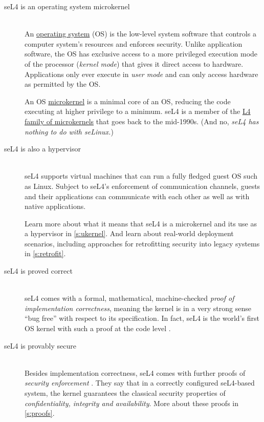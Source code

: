 \documentclass[english,a4paper,12pt\ifDraft,draft\fi]{report}
\newcommand{\Break}{\ \nopagebreak\\}
\providecommand{\href}[2]{\url{#2}}
\begin{document}
  \begin{description}
  \item[seL4 is an operating system microkernel]\Break
    An \href{https://en.wikipedia.org/wiki/Operating_system}{operating
      system} (OS) is the low-level system software that controls a
    computer system's resources and enforces security. Unlike
    application software, the OS has
    exclusive access to a more privileged execution mode of the processor (\emph{kernel mode})
    that gives it direct access to hardware. Applications only ever
    execute in
    \emph{user mode} and can only access hardware as permitted by the
    OS.

    An OS
    \href{https://en.wikipedia.org/wiki/Microkernel}{microkernel} is a
    minimal core of an OS, reducing the code executing at higher
    privilege to a minimum. seL4 is a member of the
    \href{https://en.wikipedia.org/wiki/L4_microkernel_family}{L4
      family of microkernels} that goes back to the mid-1990s.
    (And no, \emph{seL4 has nothing to do with seLinux.})

  \item[seL4 is also a hypervisor] \Break
    seL4 supports virtual machines that can run a fully fledged guest OS
    such as Linux. Subject to seL4's enforcement of communication
    channels,  guests and their applications can communicate with
    each other as well as with native applications.

   Learn  more about what it means that seL4 is a microkernel and its use as
    a hypervisor in \autoref{s:ukernel}. And learn about real-world
    deployment scenarios, including approaches for retrofitting security into
    legacy systems in \autoref{s:retrofit}.

  \item[seL4 is proved correct]\Break
    seL4 comes with a formal, mathematical, machine-checked
    \emph{proof of implementation correctness}, meaning the kernel is
    in a very strong sense ``bug free'' with respect to its specification.
    In fact, seL4 is the world's
    first OS kernel with such a proof at the code level
    \citep{Klein_EHA_etal_09}.

  \item[seL4 is provably secure]\Break
    Besides implementation correctness, seL4 comes with further proofs of
    \emph{security enforcement} \citep{Klein_AEMSKH_14}. They say that
    in a correctly configured seL4-based system,  the kernel
    guarantees the classical security properties of
    \emph{confidentiality, integrity and availability}. More about
    these proofs in \autoref{s:proofs}.


\end{description}
\end{document}

